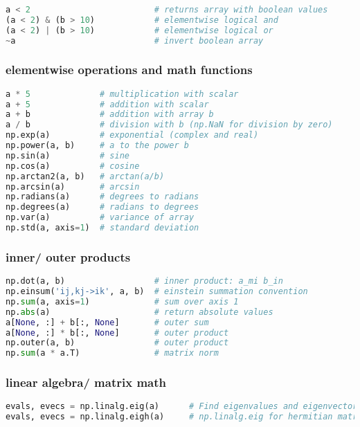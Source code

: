 \documentclass[]{article}
\begin{document}
\begin{lstlisting}[language=Python]
a < 2                         # returns array with boolean values
(a < 2) & (b > 10)            # elementwise logical and
(a < 2) | (b > 10)            # elementwise logical or
~a                            # invert boolean array
\end{lstlisting}

\subsubsection{elementwise operations and math
functions}\label{elementwise-operations-and-math-functions}

\begin{lstlisting}[language=Python]
a * 5              # multiplication with scalar
a + 5              # addition with scalar
a + b              # addition with array b
a / b              # division with b (np.NaN for division by zero)
np.exp(a)          # exponential (complex and real)
np.power(a, b)     # a to the power b
np.sin(a)          # sine
np.cos(a)          # cosine
np.arctan2(a, b)   # arctan(a/b)
np.arcsin(a)       # arcsin
np.radians(a)      # degrees to radians
np.degrees(a)      # radians to degrees
np.var(a)          # variance of array
np.std(a, axis=1)  # standard deviation
\end{lstlisting}

\subsubsection{inner/ outer products}\label{inner-outer-products}

\begin{lstlisting}[language=Python]
np.dot(a, b)                  # inner product: a_mi b_in
np.einsum('ij,kj->ik', a, b)  # einstein summation convention
np.sum(a, axis=1)             # sum over axis 1
np.abs(a)                     # return absolute values
a[None, :] + b[:, None]       # outer sum
a[None, :] * b[:, None]       # outer product
np.outer(a, b)                # outer product
np.sum(a * a.T)               # matrix norm
\end{lstlisting}

\subsubsection{linear algebra/ matrix
math}\label{linear-algebra-matrix-math}

\begin{lstlisting}[language=Python]
evals, evecs = np.linalg.eig(a)      # Find eigenvalues and eigenvectors
evals, evecs = np.linalg.eigh(a)     # np.linalg.eig for hermitian matrix
\end{lstlisting}
\end{document}
